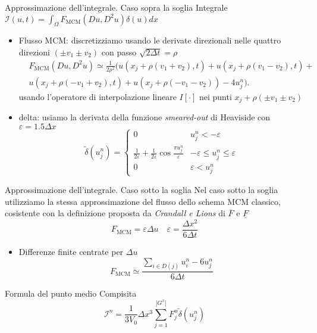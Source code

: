 \begin{frame}{Approssimazione dell'integrale. Caso sopra la soglia}
  Integrale $\mathcal{I}(u,t)=\int_{\Omega}F_{\text{MCM}}(Du,D^2u)\delta(u)dx$
  \begin{itemize}
    \item \alert{Flusso MCM}: discretizziamo usando le derivate direzionali
      nelle \alert{quattro} direzioni $(\pm v_1\pm v_2)$ con passo
      $\sqrt{2\Delta t}=\rho$
      \[
      \begin{aligned}
      &F_{\text{MCM}}(Du,D^2u)\simeq\frac{1}{2\rho^2}(u(x_j+\rho(v_1+v_2),t)+u(x_j+\rho(v_1-v_2),t)+\\ 
      &u(x_j+\rho(-v_1+v_2),t)+u(x_j+\rho(-v_1-v_2))-4u_j^n).
      \end{aligned}
      \]
      usando l'operatore di interpolazione lineare $I[\cdot]$ nei
      punti $x_j+\rho(\pm v_1\pm v_2)$ 
    \item \alert{delta}: usiamo la derivata della funzione
      \emph{smeared-out} di Heaviside con $\varepsilon=1.5\Delta x$
      \[
        \tilde{\delta}(u_j^n)=
        \begin{cases}
          0  &u_j^n<-\varepsilon \\
         \frac{1}{2\varepsilon}+\frac{1}{2\varepsilon}\cos{\frac{\pi
              u_j^n}{\varepsilon}} &-\varepsilon\leq u_j^n\leq\varepsilon \\
          0  &\varepsilon< u_j^n
        \end{cases}
        \] 
  \end{itemize}
\end{frame}
 
\begin{frame}{Approssimazione dell'integrale. Caso sotto la soglia}
  Nel caso sotto la soglia utilizziamo la stessa approssimazione del
  flusso dello schema MCM classico, cosistente con la definizione
  proposta da \emph{Crandall e Lions} di $\overline{F}$ e
  $\underline{F}$
  \[
  F_{\text{MCM}}=\varepsilon\Delta u\quad \varepsilon=\frac{\Delta
    x^2}{6\Delta t}
  \]
  \begin{itemize}
  \item Differenze finite centrate per $\Delta u$
    \[
    F_{\text{MCM}}\simeq\frac{\sum_{i\in D(j)}u_i^n -6u_j^n}{6\Delta t}
    \]
  \end{itemize}
  \begin{alertblock}{Formula del punto medio Compisita}
    \[
    \mathcal{I}^n=\frac{1}{3V_0}\Delta x^3\sum_{j=1}^{|G^x|}F_j^n\tilde{\delta}(u_j^n)
    \]
  \end{alertblock}
\end{frame}
